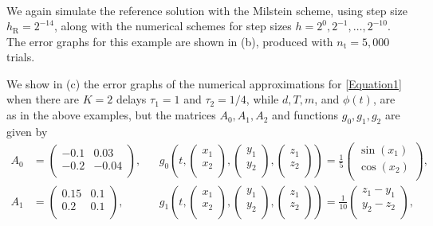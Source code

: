 \documentclass[onefignum]{siamart250211}
\begin{document}
\begin{example}
\begin{align}
\end{align}
We again simulate the reference solution with the Milstein scheme, using step size $h_\mathrm{R}=2^{-14}$, along with the numerical schemes for step sizes $h=2^0,2^{-1},\ldots,2^{-10}$. The error graphs for this example are shown in  (b), produced with $n_\mathrm{t}=5,000$ trials.
\end{example}





\begin{example}\label{Example3} We show in  (c) the error graphs of the numerical approximations for \cref{Equation1} when there are $K=2$ delays $\tau_1=1$ and $\tau_2=1/4$, while $d,T,m$, and $\phi(t)$, are as in the above examples, but the matrices $A_0,A_1,A_2$ and functions $g_0,g_1,g_2$ are given by
\begin{align}
A_0&=\begin{pmatrix}-0.1&0.03\\-0.2&-0.04\\ \end{pmatrix},&&g_0\left(t,\begin{pmatrix}x_1\\x_2\\ \end{pmatrix},\begin{pmatrix}y_1\\y_2\\ \end{pmatrix},\begin{pmatrix}z_1\\z_2\\ \end{pmatrix}\right)=\frac{1}{5}\begin{pmatrix} \sin(x_1) \\ \cos(x_2) \\ \end{pmatrix},\label{Example3Parameters}\\
A_1&=\begin{pmatrix}0.15&0.1\\0.2&0.1\\ \end{pmatrix},&&g_1\left(t,\begin{pmatrix}x_1\\x_2\\ \end{pmatrix},\begin{pmatrix}y_1\\y_2\\ \end{pmatrix},\begin{pmatrix}z_1\\z_2\\ \end{pmatrix}\right)=\frac{1}{10}\begin{pmatrix} z_1-y_1 \\ y_2-z_2 \\ \end{pmatrix},\nonumber\\

\end{align}
\end{example}
\end{document}
